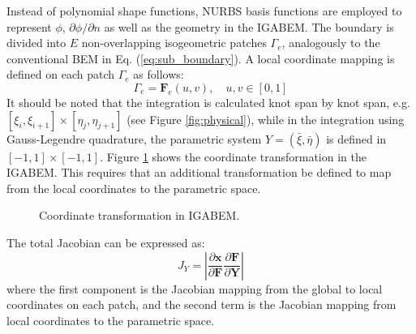 \documentclass[review]{elsarticle}
\begin{document}
Instead of polynomial shape functions, NURBS basis functions are employed to represent $\phi$, $\partial\phi/\partial n$ as well as the geometry in the IGABEM. The boundary is divided into $E$ non-overlapping isogeometric patches $\Gamma_e$, analogously to the conventional BEM in Eq. (\ref{eq:sub_boundary}). A local coordinate mapping is defined on each patch $\Gamma_e$ as follows:
\begin{equation}
\Gamma_e={\mathbf{F}_e(u,v),  \quad u,v\in[0,1]}
\end{equation}
It should be noted that the integration is calculated knot span by knot span, e.g. $[\xi_i,\xi_{i+1}]\times[\eta_j,\eta_{j+1}]$ (see Figure \ref{fig:physical}), while in the integration using Gauss-Legendre quadrature, the parametric system $Y=(\bar{\xi},\bar{\eta})$ is defined in $[-1,1]\times[-1,1]$. Figure \ref{fig:phy_loc} shows the coordinate transformation in the IGABEM. This requires that an additional transformation be defined to map from the local coordinates to the parametric space.

\begin{figure}[!htb]
	\centering
	\hspace{-0.5cm}  
	\hspace{2cm}
	\caption{Coordinate transformation in IGABEM.}
	\label{fig:phy_loc}
\end{figure}

The total Jacobian can be expressed as:
\begin{equation}
J_Y = \left|\frac{\partial{\mathbf{x}}}{\partial{\boldsymbol{F}}} \frac{\partial{\boldsymbol{F}}}{\partial{\boldsymbol {Y}}}\right|
\label{eq:IGA_mapping}
\end{equation}
where the first component is the Jacobian mapping from the global to local coordinates on each patch, and the second term is the Jacobian mapping from local coordinates to the parametric space. 
\end{document}
